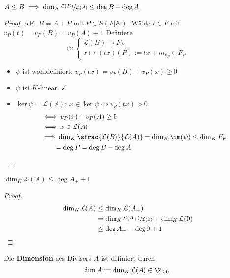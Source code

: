 \begin{lemma}
    $A \leq B \implies \dim_K \sfrac{\mathcal{L}(B)}{\mathcal{L}(A)} \leq \deg B - \deg A$
\end{lemma}
\begin{proof}
    o.E. $B=A+P$ mit $P \in S(F|K)$.
    Wähle $t \in F$ mit $v_P(t) = v_P(B) = v_P(A) +1$
    Definiere
    $$ \psi : \begin{cases}
        \mathcal{L}(B) \to F_P\\
        x \mapsto (tx)(P) := tx + m_{v_P} \in F_P
    \end{cases}$$
    \begin{itemize}
        \item $\psi$ ist wohldefiniert: $v_P(tx) = v_P(B) + v_P(x) \geq 0$
        \item $\psi$ ist $K$-linear: $\checkmark$
        \item $\ker \psi = \mathcal{L}(A)$: $x \in \ker \psi \iff v_P(tx) > 0$
        \begin{align*}
            & \iff v_P(x) + v_P(A) \geq 0\\
            & \iff x \in \mathcal{L}(A)\\
            & \implies \dim_K \sfrac{\mathcal{L}(B)}{\mathcal{L}(A)} = \dim_K \im (\psi) \leq \dim_K F_P\\
            & \qquad = \deg P = \deg B - \deg A
        \end{align*}
    \end{itemize}
\end{proof}

\begin{satz}
    $\dim_K \mathcal{L}(A) \leq \deg A_+ + 1$
\end{satz}
\begin{proof}
    \begin{align*}
        \dim_K \mathcal{L}(A) &\leq \dim_K \mathcal{L}(A_+)\\
        & = \dim_K \sfrac{\mathcal{L}(A_+)}{\mathcal{L}(0)} + \dim_K \mathcal{L}(0)\\
        & \leq \deg A_+ - \deg 0 + 1
    \end{align*}
\end{proof}

\begin{definition}
    Die \textbf{Dimension} des Divisors $A$ ist definiert durch
    $$ \dim A := \dim_K \mathcal{L}(A) \in \Z_{\geq 0}.$$
\end{definition}

